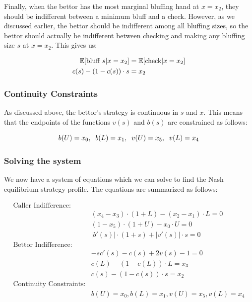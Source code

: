 \documentclass[a4paper,12pt]{article}
\begin{document}
Finally, when the bettor has the most marginal bluffing hand at $x=x_2$, they should be indifferent between a minimum bluff and a check. However, as we discussed earlier, the bettor should be indifferent among all bluffing sizes, so the bettor should actually be indifferent between checking and making any bluffing size $s$ at $x=x_2$. This gives us:

\begin{align}{\label{bluffindiff}}
    \nonumber \mathbb{E}[\text{bluff } s | x=x_2] & = \mathbb{E}[\text{check} | x=x_2]\\ 
    c(s) - (1-c(s)) \cdot s & = x_2
\end{align}


\subsubsection{Continuity Constraints}

As discussed above, the bettor's strategy is continuous in $s$ and $x$. This means that the endpoints of the functions $v(s)$ and $b(s)$ are constrained as follows:

\begin{equation}{\label{continuityconstraints}}
	 b(U) = x_0, \;\; b(L) = x_1, \;\; v(U) = x_5, \;\; v(L) = x_4
\end{equation}

\subsubsection{Solving the system}
We now have a system of equations which we can solve to find the Nash equilibrium strategy profile. The equations are summarized as follows:

\begin{align*}
    \text{Caller Indifference:} & \\
    & (x_4-x_3) \cdot (1+L) - (x_2-x_1) \cdot L = 0\\
    & (1-x_5) \cdot (1+U) - x_0 \cdot U = 0\\
    & |b'(s)| \cdot (1 + s) + |v'(s)| \cdot s = 0\\
    \text{Bettor Indifference:} & \\
    & -sc'(s) - c(s) + 2 v(s) - 1 = 0\\
    & c(L) - (1-c(L)) \cdot L = x_3\\
    & c(s) - (1-c(s)) \cdot s = x_2\\
    \text{Continuity Constraints:} & \\
    & b(U) = x_0, b(L) = x_1, v(U) = x_5, v(L) = x_4
\end{align*}
\end{document}
